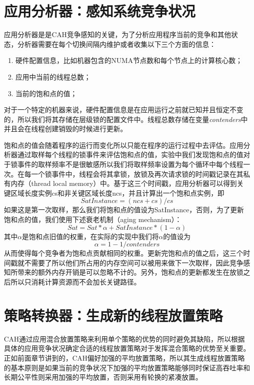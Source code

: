 \section{应用分析器：感知系统竞争状况}
应用分析器是是CAH竞争感知的关键，为了分析应用程序当前的竞争和其他状态，分析器需要在每个切换间隔内维护或者收集以下三个方面的信息：
\begin{enumerate}
  \item 硬件配置信息，比如机器包含的NUMA节点数和每个节点上的计算核心数；
  \item 应用中当前的线程总数；
  \item 当前的饱和点的值；
\end{enumerate}
对于一个特定的机器来说，硬件配置信息是在应用运行之前就已知并且恒定不变的，所以我们将其存储在层级锁的配置文件中。线程总数存储在变量\emph{contenders}中并且会在线程创建销毁的时候进行更新。

饱和点的值会随着程序的运行而变化所以只能在程序的运行过程中去评估。应用分析器通过取样每个线程的锁事件来评估饱和点的值，实验中我们发现饱和点的值对于锁事件的取样频率不是很敏感所以我们将取样频率设置为每个循环中每个线程一次。在每一个锁事件中，线程会将其拿锁，放锁及再次请求锁的时间戳记录在其私有内存（thread local memory）中。基于这三个时间戳，应用分析器可以得到关键区域长度实例cs和非关键区域长度ncs，并且计算出一个饱和点实例，即
\begin{equation}\label{Eq:saturationInstance}
     SatInstance = (ncs + cs) / cs
\end{equation}
如果这是第一次取样，那么我们将饱和点的值设为SatInstance，否则，为了更新饱和点的值，我们使用下述衰老机制（aging mechanism）：
\begin{equation}
     Sat = Sat * \alpha + SatInstance * (1 - \alpha)
\end{equation}
其中$\alpha$是饱和点旧值的权重，在实际的实现中我们将$\alpha$的值设为
\begin{equation}
     \alpha = 1 - 1/contenders
\end{equation} 
从而使得每个竞争者为饱和点贡献相同的权重。更新完饱和点的值之后，这三个时间戳就不需要了所以他们所占用的内存空间可以被用来做下一次取样，因此竞争感知所带来的额外内存开销是可以忽略不计的。另外，饱和点的更新都发生在放锁之后所以只消耗计算资源而不会加长关键路径。

\section{策略转换器：生成新的线程放置策略}
CAH通过应用混合放置策略来利用单个策略的优势的同时避免其缺陷，所以根据具体的应用竞争状况确定合适的线程放置策略对于发挥混合策略的优势至关重要。正如前面章节讲到的，CAH偏好加强的平均放置策略，所以其生成线程放置策略的基本原则是如果当前的竞争状况下加强的平均放置策略能够同时保证高吞吐率和长期公平性则采用加强的平均放置，否则采用有轮换的紧凑放置。


